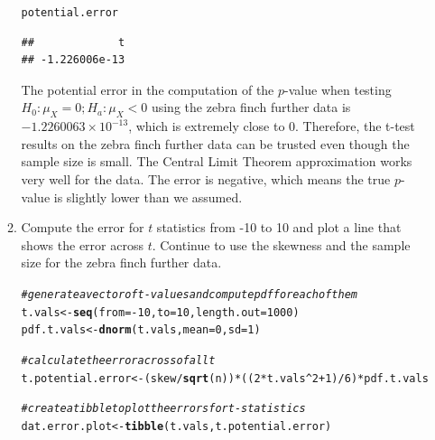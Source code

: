 \documentclass{article}\usepackage[]{graphicx}\usepackage[]{xcolor}
\makeatletter
\newcommand{\hlnum}[1]{\textcolor[rgb]{0.686,0.059,0.569}{#1}}%
\newcommand{\hlcom}[1]{\textcolor[rgb]{0.678,0.584,0.686}{\textit{#1}}}%
\newcommand{\hlopt}[1]{\textcolor[rgb]{0,0,0}{#1}}%
\newcommand{\hldef}[1]{\textcolor[rgb]{0.345,0.345,0.345}{#1}}%
\newcommand{\hlkwb}[1]{\textcolor[rgb]{0.69,0.353,0.396}{#1}}%
\newcommand{\hlkwc}[1]{\textcolor[rgb]{0.333,0.667,0.333}{#1}}%
\newcommand{\hlkwd}[1]{\textcolor[rgb]{0.737,0.353,0.396}{\textbf{#1}}}%
\newenvironment{kframe}{%
 \def\at@end@of@kframe{}%
 \ifinner\ifhmode%
  \def\at@end@of@kframe{\end{minipage}}%
  \begin{minipage}{\columnwidth}%
 \fi\fi%
 \def\FrameCommand##1{\hskip\@totalleftmargin \hskip-\fboxsep
 \colorbox{shadecolor}{##1}\hskip-\fboxsep
     \hskip-\linewidth \hskip-\@totalleftmargin \hskip\columnwidth}%
 \MakeFramed {\advance\hsize-\width
   \@totalleftmargin\z@ \linewidth\hsize
   \@setminipage}}%
 {\par\unskip\endMakeFramed%
 \at@end@of@kframe}
\newenvironment{knitrout}{}{} %
\makeatother
\begin{document}
\begin{enumerate}
\begin{enumerate}
\begin{knitrout}
\begin{kframe}
\begin{alltt}
\hldef{potential.error}
\end{alltt}
\begin{verbatim}
##             t 
## -1.226006e-13
\end{verbatim}
\end{kframe}
\end{knitrout}
The potential error in the computation of the $p$-value when testing $H_0: \mu_X=0; H_a: \mu_X<0$ using the zebra finch further data is \ensuremath{-1.2260063\times 10^{-13}}, which is extremely close to 0. Therefore, the t-test results on the zebra finch further data can be trusted even though the sample size is small. The Central Limit Theorem approximation works very well for the data. The error is negative, which means the true $p$-value is slightly lower than we assumed.
  \item Compute the error for $t$ statistics from -10 to 10 and plot a line
  that shows the error across $t$. Continue to use the skewness and 
  the sample size for the zebra finch further data.
  
\begin{knitrout}\scriptsize
{}\color{fgcolor}\begin{kframe}
\begin{alltt}
\hlcom{#generate a vector of t-values and compute pdf for each of them}
\hldef{t.vals} \hlkwb{<-} \hlkwd{seq}\hldef{(}\hlkwc{from} \hldef{=} \hlopt{-}\hlnum{10}\hldef{,} \hlkwc{to} \hldef{=} \hlnum{10}\hldef{,} \hlkwc{length.out} \hldef{=} \hlnum{1000}\hldef{)}
\hldef{pdf.t.vals} \hlkwb{<-} \hlkwd{dnorm}\hldef{(t.vals,} \hlkwc{mean} \hldef{=} \hlnum{0}\hldef{,} \hlkwc{sd} \hldef{=} \hlnum{1}\hldef{)}

\hlcom{#calculate the error across of all t}
\hldef{t.potential.error} \hlkwb{<-} \hldef{(skew}\hlopt{/}\hlkwd{sqrt}\hldef{(n))}\hlopt{*}\hldef{((}\hlnum{2}\hlopt{*}\hldef{t.vals}\hlopt{^}\hlnum{2} \hlopt{+}\hlnum{1}\hldef{)}\hlopt{/}\hlnum{6}\hldef{)}\hlopt{*}\hldef{pdf.t.vals}

\hlcom{#create a tibble to plot the errors for t-statistics}
\hldef{dat.error.plot} \hlkwb{<-} \hlkwd{tibble}\hldef{(t.vals, t.potential.error)}


\end{alltt}
\end{kframe}
\end{knitrout}
\end{enumerate}
\end{enumerate}
\end{document}
